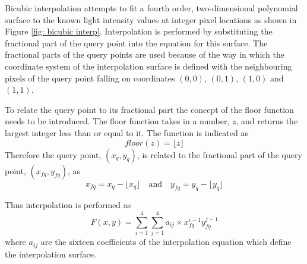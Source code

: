 \documentclass[12pt,oneside,openany,a4paper, %
english, %
masters-t, goldenblock]{usthesis}
\begin{document}
Bicubic interpolation attempts to fit a fourth order, two-dimensional polynomial surface to the known light intensity values at integer pixel locations as shown in Figure \ref{fig: bicubic interp}. Interpolation is performed by substituting the fractional part of the query point into the equation for this surface. The fractional parts of the query points are used because of the way in which the coordinate system of the interpolation surface is defined with the neighbouring pixels of the query point falling on coordinates $(0,0)$, $(0,1)$, $(1,0)$ and $(1,1)$.

To relate the query point to its fractional part the concept of the floor function needs to be introduced. The floor function takes in a number, $z$, and returns the largest integer less than or equal to it. The function is indicated as
\begin{equation}
  floor(z)=\lfloor z \rfloor
\end{equation}
Therefore the query point, $(x_q,y_q)$, is related to the fractional part of the query point, $(x_{fq},y_{fq})$, as
\begin{equation}
  x_{fq} = x_q- \lfloor x_q \rfloor \quad \text{and} \quad y_{fq} = y_q- \lfloor y_q \rfloor
\end{equation}

Thus interpolation is performed as
\begin{equation}
  F(x,y)=\sum^4_{i=1} \sum^4_{j=1} a_{ij} \times x_{fq}^{i-1} y_{fq}^{j-1}
  \label{eq: bicubic interp}
\end{equation}
where $a_{ij}$ are the sixteen coefficients of the interpolation equation which define the interpolation surface. 


\end{document}
